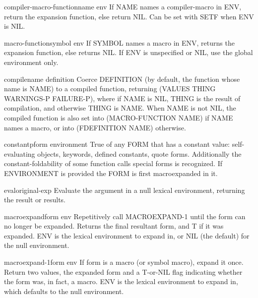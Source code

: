 \documentclass[10pt,english]{book}
\begin{document}
\begin{accessor}{compiler-macro-function}{name \op env}
  If NAME names a compiler-macro in ENV, return the expansion function, else
return NIL. Can be set with SETF when ENV is NIL.
\end{accessor}

\begin{accessor}{macro-function}{symbol \op env}
  If SYMBOL names a macro in ENV, returns the expansion function,
else returns NIL. If ENV is unspecified or NIL, use the global environment
only.
\end{accessor}

\begin{function}{compile}{name \op definition}
  Coerce DEFINITION (by default, the function whose name is NAME)
  to a compiled function, returning (VALUES THING WARNINGS-P FAILURE-P),
  where if NAME is NIL, THING is the result of compilation, and
  otherwise THING is NAME. When NAME is not NIL, the compiled function
  is also set into (MACRO-FUNCTION NAME) if NAME names a macro, or into
  (FDEFINITION NAME) otherwise.
\end{function}

\begin{function}{constantp}{form \op environment}
  True of any FORM that has a constant value: self-evaluating objects,
keywords, defined constants, quote forms. Additionally the
constant-foldability of some function calls special forms is recognized. If
ENVIRONMENT is provided the FORM is first macroexpanded in it.
\end{function}

\begin{function}{eval}{original-exp}
  Evaluate the argument in a null lexical environment, returning the
   result or results.
\end{function}

\begin{function}{macroexpand}{form \op env}
  Repetitively call MACROEXPAND-1 until the form can no longer be expanded.
   Returns the final resultant form, and T if it was expanded. ENV is the
   lexical environment to expand in, or NIL (the default) for the null
   environment.
\end{function}

\begin{function}{macroexpand-1}{form \op env}
  If form is a macro (or symbol macro), expand it once. Return two values,
   the expanded form and a T-or-NIL flag indicating whether the form was, in
   fact, a macro. ENV is the lexical environment to expand in, which defaults
   to the null environment.
\end{function}
\end{document}
